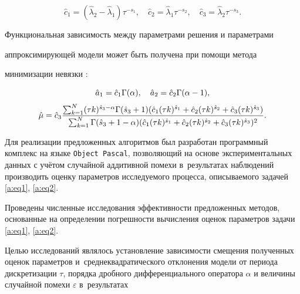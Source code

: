 \begin{equation}\label{a:eq20}

\hat{c}_1=(\hat{\lambda}_2-\hat{\lambda}_1){\tau}^{-s_1},\quad 

\hat{c}_2=\hat{\lambda}_1{\tau}^{-s_2},\quad 

\hat{c}_3=\hat{\lambda}_2{\tau}^{-s_3}.

\end{equation}



Функциональная зависимость между параметрами решения и параметрами

аппроксимирующей модели может быть получена при помощи метода

минимизации невязки \cite{v:Ch}:

\begin{gather}\label{a:eq22}

\hat{a}_1=\hat{c}_1\Gamma(\alpha),\quad 

\hat{a}_2=\hat{c}_2\Gamma(\alpha-1),\\

\hat{\mu}=\hat{c}_3 \dfrac{\sum _{k=1}^{N} (\tau k)^{\hat{s}_3 - \alpha}\Gamma(\hat{s}_3 +1)(\hat{c}_1 (\tau k)^{\hat{s}_1}+\hat{c}_2 (\tau k)^{\hat{s}_2}+\hat{c}_3 (\tau k)^{\hat{s}_3})}{\sum _{k=1}^{N} \Gamma({\hat{s}_3} +1-\alpha)(\hat{c}_1 (\tau k)^{\hat{s}_1}+\hat{c}_2 (\tau k)^{\hat{s}_2}+\hat{c}_3 (\tau k)^{\hat{s}_3}) ^2}\rule{0pt}{7mm} .

\end{gather}



\smallskip




Для реализации предложенных алгоритмов был разработан программный комплекс на языке {\tt Object Pascal}, позволяющий на основе экспериментальных данных с учётом случайной аддитивной помехи в~результатах наблюдений производить оценку параметров исследуемого процесса, описываемого задачей \eqref{a:eq1}, \eqref{a:eq2}.

Проведены численные исследования эффективности предложенных методов, основанные на определении погрешности вычисления оценок параметров задачи \eqref{a:eq1}, \eqref{a:eq2}. 

Целью исследований являлось установление зависимости смещения полученных оценок параметров и~среднеквадратического отклонения модели от периода дискретизации $\tau$, порядка дробного дифференциального оператора $\alpha$ и величины случайной помехи $\varepsilon$ в~результатах

